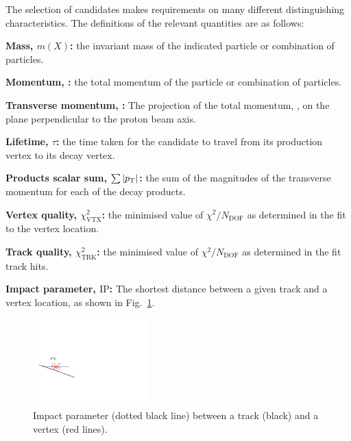 The selection of candidates makes requirements on many different distinguishing characteristics. The definitions of the relevant quantities are as follows:  
\begin{description}
\item \textbf{Mass, $m(X)$:} the invariant mass of the indicated particle or combination of particles. 
\item \textbf{Momentum, \ptot:} the total momentum of the particle or combination of particles.
\item \textbf{Transverse momentum, \pt:} The projection of the total momentum, \ptot, on the plane perpendicular to the proton beam axis.
\item \textbf{Lifetime, $\tau$:} the time taken for the candidate to travel from its production vertex to its decay vertex.
\item \textbf{Products \pt scalar sum, $\sum{|\pt|}$:} the sum of the magnitudes of the transverse momentum for each of the decay products.
\item \textbf{Vertex quality, $\chi^{2}_{\text{VTX}}$:} the minimised value of $\chi^{2}/N_{\text{DOF}}$ as determined in the fit to the vertex location.
\item \textbf{Track quality, $\chi^{2}_{\text{TRK}}$:} the minimised value of $\chi^{2}/N_{\text{DOF}}$ as determined in the fit track hits.
\item \textbf{Impact parameter, $\text{IP}$:} The shortest distance between a given track and a vertex location, as shown in Fig.~\ref{fig:impact_parameter}. 

\begin{figure}[!h]
    \centering
    \includegraphics[width=0.4\textwidth]{figs/Selection/Impact_parameter.pdf}
    \caption{Impact parameter (dotted black line) between a track (black) and a vertex (red lines).}
    \label{fig:impact_parameter}   
\end{figure}


\end{description}
